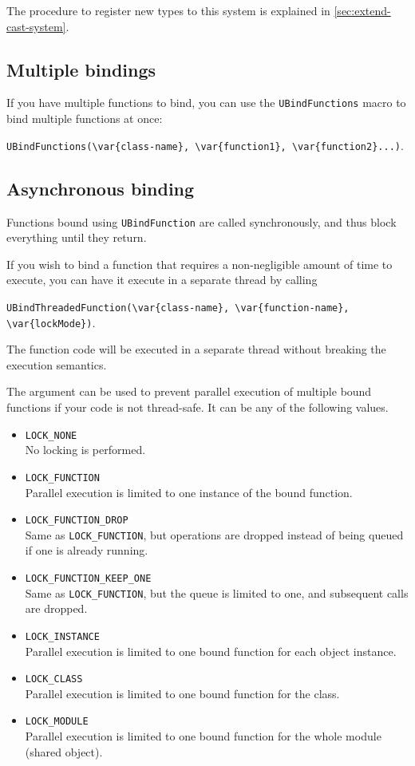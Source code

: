 The procedure to register new types to this system is explained in
\autoref{sec:extend-cast-system}.

\subsection{Multiple bindings}
If you have multiple functions to bind, you can use the
\lstinline|UBindFunctions| macro to bind multiple functions at once:

\lstinline|UBindFunctions(\var{class-name}, \var{function1}, \var{function2}...)|.

\subsection{Asynchronous binding}
\label{sec:uobject:asynchronous-binding}
Functions bound using \lstinline{UBindFunction} are called synchronously, and
thus block everything until they return.

If you wish to bind a function that requires a non-negligible amount of time
to execute, you can have it execute in a separate thread by calling

\lstinline|UBindThreadedFunction(\var{class-name}, \var{function-name}, \var{lockMode})|.

The function code will be executed in a separate thread without breaking the
\us execution semantics.

The  argument can be used to prevent parallel execution
of multiple bound functions if your code is not thread-safe. It can be any of
the following values.
\begin{itemize}
\item \lstinline{LOCK_NONE}\\
  No locking is performed.
\item \lstinline{LOCK_FUNCTION}\\
  Parallel execution is limited to one instance of the bound function.
\item \lstinline{LOCK_FUNCTION_DROP}\\
  Same as \lstinline{LOCK_FUNCTION}, but operations are dropped instead of
  being queued if one is already running.
\item \lstinline{LOCK_FUNCTION_KEEP_ONE}\\
  Same as \lstinline{LOCK_FUNCTION}, but the queue is limited to one, and
  subsequent calls are dropped.
\item \lstinline{LOCK_INSTANCE}\\
  Parallel execution is limited to one bound function for each object
  instance.
\item \lstinline{LOCK_CLASS}\\
  Parallel execution is limited to one bound function for the class.
\item \lstinline{LOCK_MODULE}\\
  Parallel execution is limited to one bound function for the whole module
  (shared object).
\end{itemize}

